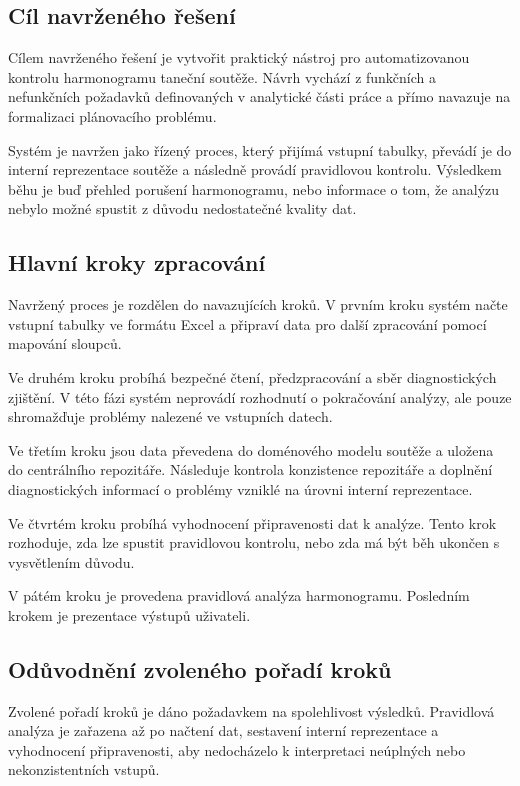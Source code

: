 \documentclass[czech, kiv, ba, he, iso690alph, pdf]{fasthesis}
\begin{document}
			\subsection{Cíl navrženého řešení}
				Cílem navrženého řešení je vytvořit praktický nástroj pro automatizovanou kontrolu harmonogramu taneční soutěže. Návrh vychází z funkčních a nefunkčních požadavků definovaných v analytické části práce a přímo navazuje na formalizaci plánovacího problému.
	
				Systém je navržen jako řízený proces, který přijímá vstupní tabulky, převádí je do interní reprezentace soutěže a následně provádí pravidlovou kontrolu. Výsledkem běhu je buď přehled porušení harmonogramu, nebo informace o tom, že analýzu nebylo možné spustit z důvodu nedostatečné kvality dat.
	
			\subsection{Hlavní kroky zpracování}
				Navržený proces je rozdělen do navazujících kroků. V prvním kroku systém načte vstupní tabulky ve formátu Excel a připraví data pro další zpracování pomocí mapování sloupců.
	
				Ve druhém kroku probíhá bezpečné čtení, předzpracování a sběr diagnostických zjištění. V této fázi systém neprovádí rozhodnutí o pokračování analýzy, ale pouze shromažďuje problémy nalezené ve vstupních datech.
	
				Ve třetím kroku jsou data převedena do doménového modelu soutěže a uložena do centrálního repozitáře. Následuje kontrola konzistence repozitáře a doplnění diagnostických informací o problémy vzniklé na úrovni interní reprezentace.
	
				Ve čtvrtém kroku probíhá vyhodnocení připravenosti dat k analýze. Tento krok rozhoduje, zda lze spustit pravidlovou kontrolu, nebo zda má být běh ukončen s vysvětlením důvodu.
	
				V pátém kroku je provedena pravidlová analýza harmonogramu. Posledním krokem je prezentace výstupů uživateli.
	
			\subsection{Odůvodnění zvoleného pořadí kroků}
				Zvolené pořadí kroků je dáno požadavkem na spolehlivost výsledků. Pravidlová analýza je zařazena až po načtení dat, sestavení interní reprezentace a vyhodnocení připravenosti, aby nedocházelo k interpretaci neúplných nebo nekonzistentních vstupů.
	
\end{document}
